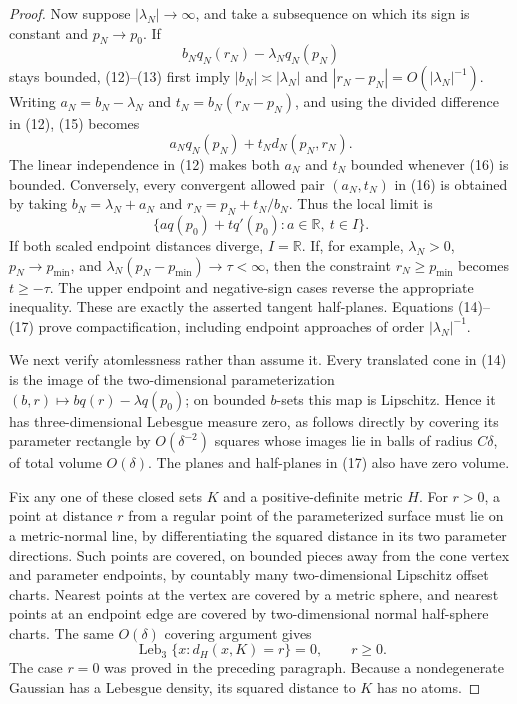 \documentclass{article}
\begin{document}
\begin{proof}
Now suppose \(|\lambda_N|\to\infty\), and take a subsequence on which its sign is constant and \(p_N\to p_0\).  If
\[
 b_Nq_N(r_N)-\lambda_Nq_N(p_N)                                               \tag{15}
\]
stays bounded, (12)--(13) first imply \(|b_N|\asymp|\lambda_N|\) and \(|r_N-p_N|=O(|\lambda_N|^{-1})\).  Writing \(a_N=b_N-\lambda_N\) and \(t_N=b_N(r_N-p_N)\), and using the divided difference in (12), (15) becomes
\[
 a_Nq_N(p_N)+t_Nd_N(p_N,r_N).                                                \tag{16}
\]
The linear independence in (12) makes both \(a_N\) and \(t_N\) bounded whenever (16) is bounded.  Conversely, every convergent allowed pair \((a_N,t_N)\) in (16) is obtained by taking \(b_N=\lambda_N+a_N\) and \(r_N=p_N+t_N/b_N\).  Thus the local limit is
\[
 \{a q(p_0)+tq'(p_0):a\in\mathbb R,\ t\in I\}.                            \tag{17}
\]
If both scaled endpoint distances diverge, \(I=\mathbb R\).  If, for example, \(\lambda_N>0\), \(p_N\to p_{\min}\), and \(\lambda_N(p_N-p_{\min})\to\tau<\infty\), then the constraint \(r_N\ge p_{\min}\) becomes \(t\ge-\tau\).  The upper endpoint and negative-sign cases reverse the appropriate inequality.  These are exactly the asserted tangent half-planes.  Equations (14)--(17) prove compactification, including endpoint approaches of order \(|\lambda_N|^{-1}\).

We next verify atomlessness rather than assume it.  Every translated cone in (14) is the image of the two-dimensional parameterization \((b,r)\mapsto bq(r)-\lambda q(p_0)\); on bounded \(b\)-sets this map is Lipschitz.  Hence it has three-dimensional Lebesgue measure zero, as follows directly by covering its parameter rectangle by \(O(\delta^{-2})\) squares whose images lie in balls of radius \(C\delta\), of total volume \(O(\delta)\).  The planes and half-planes in (17) also have zero volume.

Fix any one of these closed sets \(K\) and a positive-definite metric \(H\).  For \(r>0\), a point at distance \(r\) from a regular point of the parameterized surface must lie on a metric-normal line, by differentiating the squared distance in its two parameter directions.  Such points are covered, on bounded pieces away from the cone vertex and parameter endpoints, by countably many two-dimensional Lipschitz offset charts.  Nearest points at the vertex are covered by a metric sphere, and nearest points at an endpoint edge are covered by two-dimensional normal half-sphere charts.  The same \(O(\delta)\) covering argument gives
\[
 \operatorname{Leb}_3\{x:d_H(x,K)=r\}=0,
 \qquad r\ge0.                                                               \tag{18}
\]
The case \(r=0\) was proved in the preceding paragraph.  Because a nondegenerate Gaussian has a Lebesgue density, its squared distance to \(K\) has no atoms.


\end{proof}
\end{document}
